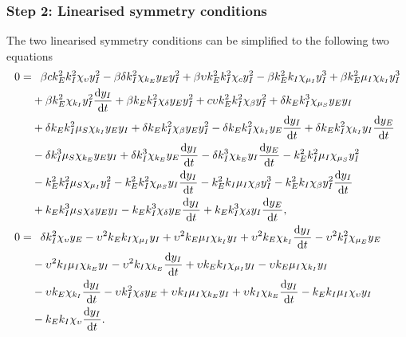 \documentclass[12pt]{article}
\begin{document}
\subsubsection*{Step 2: Linearised symmetry conditions}



The two linearised symmetry conditions can be simplified to the following two equations
\begin{align}
0 =&\textcolor{white}{-}\beta c k_{E}^{2} k_{I}^{2} \chi_{\upsilon} y_{I}^{2} - \beta \delta k_{I}^{2} \chi_{k_{E}} y_{E} y_{I}^{2} + \beta \upsilon k_{E}^{2} k_{I}^{2} \chi_{c} y_{I}^{2} - \beta k_{E}^{2} k_{I} \chi_{\mu_{I}} y_{I}^{3} + \beta k_{E}^{2} \mu_{I} \chi_{k_{I}} y_{I}^{3} \nonumber\\
&+ \beta k_{E}^{2} \chi_{k_{I}} y_{I}^{2} \dfrac{\mathrm{d}y_{I}}{\mathrm{d}t} + \beta k_{E} k_{I}^{2} \chi_{\delta} y_{E} y_{I}^{2} + c \upsilon k_{E}^{2} k_{I}^{2} \chi_{\beta} y_{I}^{2} + \delta k_{E} k_{I}^{3} \chi_{\mu_{S}} y_{E} y_{I} \nonumber\\
&+ \delta k_{E} k_{I}^{2} \mu_{S} \chi_{k_{I}} y_{E} y_{I} + \delta k_{E} k_{I}^{2} \chi_{\beta} y_{E} y_{I}^{2} - \delta k_{E} k_{I}^{2} \chi_{k_{I}} y_{E} \dfrac{\mathrm{d}y_{I}}{\mathrm{d}t} + \delta k_{E} k_{I}^{2} \chi_{k_{I}} y_{I} \dfrac{\mathrm{d}y_{E}}{\mathrm{d}t} \nonumber\\
&- \delta k_{I}^{3} \mu_{S} \chi_{k_{E}} y_{E} y_{I} + \delta k_{I}^{3} \chi_{k_{E}} y_{E} \dfrac{\mathrm{d}y_{I}}{\mathrm{d}t} - \delta k_{I}^{3} \chi_{k_{E}} y_{I} \dfrac{\mathrm{d}y_{E}}{\mathrm{d}t} - k_{E}^{2} k_{I}^{2} \mu_{I} \chi_{\mu_{S}} y_{I}^{2} \nonumber\\
&- k_{E}^{2} k_{I}^{2} \mu_{S} \chi_{\mu_{I}} y_{I}^{2} - k_{E}^{2} k_{I}^{2} \chi_{\mu_{S}} y_{I} \dfrac{\mathrm{d}y_{I}}{\mathrm{d}t} - k_{E}^{2} k_{I} \mu_{I} \chi_{\beta} y_{I}^{3} - k_{E}^{2} k_{I} \chi_{\beta} y_{I}^{2} \dfrac{\mathrm{d}y_{I}}{\mathrm{d}t} \nonumber\\
&+ k_{E} k_{I}^{3} \mu_{S} \chi_{\delta} y_{E} y_{I} - k_{E} k_{I}^{3} \chi_{\delta} y_{E} \dfrac{\mathrm{d}y_{I}}{\mathrm{d}t} + k_{E} k_{I}^{3} \chi_{\delta} y_{I} \dfrac{\mathrm{d}y_{E}}{\mathrm{d}t},\label{eq:lin_sym_SEI_1}\\
0 =&\textcolor{white}{-}\delta k_{I}^{2} \chi_{\upsilon} y_{E} - \upsilon^{2} k_{E} k_{I} \chi_{\mu_{I}} y_{I} + \upsilon^{2} k_{E} \mu_{I} \chi_{k_{I}} y_{I} + \upsilon^{2} k_{E} \chi_{k_{I}} \dfrac{\mathrm{d}y_{I}}{\mathrm{d}t} - \upsilon^{2} k_{I}^{2} \chi_{\mu_{E}} y_{E} \nonumber\\
&- \upsilon^{2} k_{I} \mu_{I} \chi_{k_{E}} y_{I} - \upsilon^{2} k_{I} \chi_{k_{E}} \dfrac{\mathrm{d}y_{I}}{\mathrm{d}t} + \upsilon k_{E} k_{I} \chi_{\mu_{I}} y_{I} - \upsilon k_{E} \mu_{I} \chi_{k_{I}} y_{I} \nonumber\\
&- \upsilon k_{E} \chi_{k_{I}} \dfrac{\mathrm{d}y_{I}}{\mathrm{d}t} - \upsilon k_{I}^{2} \chi_{\delta} y_{E} + \upsilon k_{I} \mu_{I} \chi_{k_{E}} y_{I} + \upsilon k_{I} \chi_{k_{E}} \dfrac{\mathrm{d}y_{I}}{\mathrm{d}t} - k_{E} k_{I} \mu_{I} \chi_{\upsilon} y_{I}\nonumber\\
&- k_{E} k_{I} \chi_{\upsilon} \dfrac{\mathrm{d}y_{I}}{\mathrm{d}t}.\label{eq:lin_sym_SEI_2}
\end{align}
\end{document}
